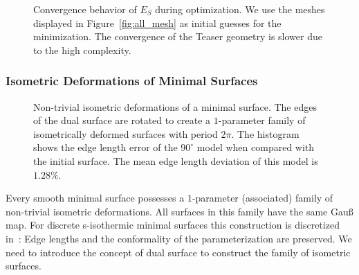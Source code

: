 \documentclass[Thesis.tex]{subfiles}
\begin{document}
\begin{figure}
\centering
{}
\caption[Convergence behavior of $E_S$]{Convergence behavior of $E_S$ during optimization. We use the meshes 
displayed in Figure~\ref{fig:all_mesh} as initial guesses for the minimization. The
convergence of the Teaser geometry is slower due to the high complexity.}
\label{fig:convergence}
\end{figure}

\subsubsection{Isometric Deformations of Minimal Surfaces}
\label{sub:isometric}
\begin{figure}
\centering
\resizebox{\textwidth}{!}{}
\caption{Non-trivial isometric deformations of a minimal surface. The edges of the dual
surface are rotated to create a \mbox{$1$-parameter} family of isometrically
deformed surfaces with 
period $2\pi$. The histogram shows the edge length error of the $90^\circ$ model
when compared 
with the initial surface. The mean edge length deviation of this model is $1.28\%$.}
\label{fig:isometric} 
\end{figure}

Every smooth minimal surface possesses a $1$-parameter (associated) family of
non-trivial isometric deformations. All surfaces in this family have the same
Gau{\ss} map. For discrete s-isothermic minimal surfaces this construction is
discretized in~\cite{BobHofSpr06}: Edge lengths and the conformality of the
parameterization are preserved. We need to introduce the concept of dual surface
to construct the family of isometric surfaces.
\end{document}
